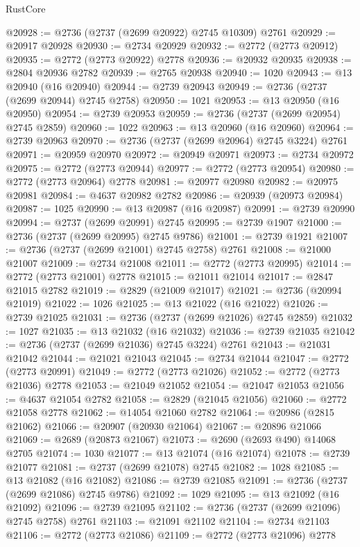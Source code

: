 \begin{lexlean}{RustCore}
\begin{coremodule}
@20928 := @2736 (@2737 (@2699 @20922) @2745 @10309) @2761
@20929 := @20917 @20928
@20930 := @2734 @20929
@20932 := @2772 (@2773 @20912)
@20935 := @2772 (@2773 @20922) @2778
@20936 := @20932 @20935
@20938 := @2804 @20936 @2782
@20939 := @2765 @20938
@20940 := 1020
@20943 := @13 @20940 (@16 @20940)
@20944 := @2739 @20943
@20949 := @2736 (@2737 (@2699 @20944) @2745 @2758)
@20950 := 1021
@20953 := @13 @20950 (@16 @20950)
@20954 := @2739 @20953
@20959 := @2736 (@2737 (@2699 @20954) @2745 @2859)
@20960 := 1022
@20963 := @13 @20960 (@16 @20960)
@20964 := @2739 @20963
@20970 := @2736 (@2737 (@2699 @20964) @2745 @3224) @2761
@20971 := @20959 @20970
@20972 := @20949 @20971
@20973 := @2734 @20972
@20975 := @2772 (@2773 @20944)
@20977 := @2772 (@2773 @20954)
@20980 := @2772 (@2773 @20964) @2778
@20981 := @20977 @20980
@20982 := @20975 @20981
@20984 := @4637 @20982 @2782
@20986 := @20939 (@20973 @20984)
@20987 := 1025
@20990 := @13 @20987 (@16 @20987)
@20991 := @2739 @20990
@20994 := @2737 (@2699 @20991) @2745
@20995 := @2739 @1907
@21000 := @2736 (@2737 (@2699 @20995) @2745 @9786)
@21001 := @2739 @1921
@21007 := @2736 (@2737 (@2699 @21001) @2745 @2758) @2761
@21008 := @21000 @21007
@21009 := @2734 @21008
@21011 := @2772 (@2773 @20995)
@21014 := @2772 (@2773 @21001) @2778
@21015 := @21011 @21014
@21017 := @2847 @21015 @2782
@21019 := @2829 (@21009 @21017)
@21021 := @2736 (@20994 @21019)
@21022 := 1026
@21025 := @13 @21022 (@16 @21022)
@21026 := @2739 @21025
@21031 := @2736 (@2737 (@2699 @21026) @2745 @2859)
@21032 := 1027
@21035 := @13 @21032 (@16 @21032)
@21036 := @2739 @21035
@21042 := @2736 (@2737 (@2699 @21036) @2745 @3224) @2761
@21043 := @21031 @21042
@21044 := @21021 @21043
@21045 := @2734 @21044
@21047 := @2772 (@2773 @20991)
@21049 := @2772 (@2773 @21026)
@21052 := @2772 (@2773 @21036) @2778
@21053 := @21049 @21052
@21054 := @21047 @21053
@21056 := @4637 @21054 @2782
@21058 := @2829 (@21045 @21056)
@21060 := @2772 @21058 @2778
@21062 := @14054 @21060 @2782
@21064 := @20986 (@2815 @21062)
@21066 := @20907 (@20930 @21064)
@21067 := @20896 @21066
@21069 := @2689 (@20873 @21067)
@21073 := @2690 (@2693 @490) @14068 @2705
@21074 := 1030
@21077 := @13 @21074 (@16 @21074)
@21078 := @2739 @21077
@21081 := @2737 (@2699 @21078) @2745
@21082 := 1028
@21085 := @13 @21082 (@16 @21082)
@21086 := @2739 @21085
@21091 := @2736 (@2737 (@2699 @21086) @2745 @9786)
@21092 := 1029
@21095 := @13 @21092 (@16 @21092)
@21096 := @2739 @21095
@21102 := @2736 (@2737 (@2699 @21096) @2745 @2758) @2761
@21103 := @21091 @21102
@21104 := @2734 @21103
@21106 := @2772 (@2773 @21086)
@21109 := @2772 (@2773 @21096) @2778

\end{coremodule}
\end{lexlean}
